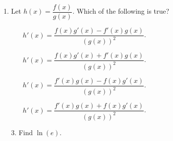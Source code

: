 \documentclass[11pt]{article}
\begin{document}
\pagestyle{empty}
\newsavebox{\quizfront}
\begin{lrbox}{\quizfront}
\begin{minipage}[top][4.5in][t]{\textwidth} \setlength{\parindent}{1.5em}
\drawtitle
\vspace{-0.5in}
\begin{enumerate}

\item Let $h(x) = \dfrac{f(x)}{g(x)}$.  Which of the following is true?
  \vfill
  \begin{itemize}
  \item[\textbigcircle] $h'(x) = \dfrac{f(x)g'(x)-f'(x)g(x)}{(g(x))^2}$.
    \vfill
  \item[\textbigcircle] $h'(x) = \dfrac{f(x)g'(x)+f'(x)g(x)}{(g(x))^2}$.
    \vfill
  \item[\textbigcircle] $h'(x) = \dfrac{f'(x)g(x)-f(x)g'(x)}{(g(x))^2}$.
    \vfill
  \item[\textbigcircle] $h'(x) = \dfrac{f'(x)g(x)+f(x)g'(x)}{(g(x))^2}$.
    \vfill
  \end{itemize}
\end{enumerate}



\end{minipage}
\end{lrbox}

\newsavebox{\quizback}
\begin{lrbox}{\quizback}
\begin{minipage}[top][4.5in][t]{\textwidth} \setlength{\parindent}{1.5em}
\begin{itemize}
 \item[3.] Find $\ln(e)$. 


\end{itemize}
\end{minipage}
\end{lrbox}

\noindent \usebox{\quizfront}
\vfill
\noindent \usebox{\quizfront}

\end{document}
